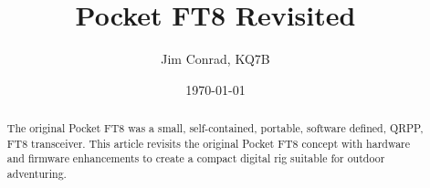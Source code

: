 \documentclass[10pt, letterpaper,]{article}
\title{Pocket FT8 Revisited}
\author{Jim Conrad, KQ7B}
\date{\today}
\begin{document}
	\maketitle



\begin{abstract}
 The original Pocket FT8  was a small, self-contained, portable, software defined, QRPP, FT8 transceiver. 
 This article revisits the original Pocket FT8 concept with hardware and firmware enhancements to create a compact digital rig  suitable for outdoor adventuring.
\end{abstract}
\end{document}
